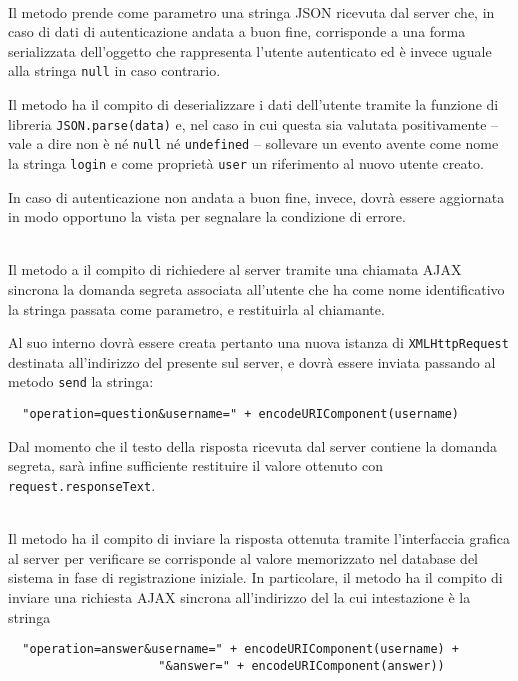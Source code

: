 \begin{description}

\item{}\\
Il metodo prende come parametro una stringa JSON ricevuta dal server che, in caso di dati di autenticazione andata a buon fine, corrisponde a una forma serializzata dell'oggetto che rappresenta l'utente autenticato ed è invece uguale alla stringa \verb+null+ in caso contrario.

Il metodo ha il compito di deserializzare i dati dell'utente tramite la funzione di libreria \verb+JSON.parse(data)+ e, nel caso in cui questa sia valutata positivamente -- vale a dire non è né \verb+null+ né \verb+undefined+ -- sollevare un evento avente come nome la stringa \verb'login' e come proprietà \verb+user+ un riferimento al nuovo utente creato.

In caso di autenticazione non andata a buon fine, invece, dovrà essere aggiornata in modo opportuno la vista per segnalare la condizione di errore.

\item{}\\
Il metodo a il compito di richiedere al server tramite una chiamata AJAX sincrona la domanda segreta associata all'utente che ha come nome identificativo la stringa passata come parametro, e restituirla al chiamante.

Al suo interno dovrà essere creata pertanto una nuova istanza di \verb+XMLHttpRequest+ destinata all'indirizzo del  presente sul server, e dovrà essere inviata  passando al metodo \verb+send+ la stringa:
\begin{verbatim}
  "operation=question&username=" + encodeURIComponent(username)
\end{verbatim}

Dal momento che il testo della risposta ricevuta dal server contiene la domanda segreta, sarà infine sufficiente restituire il valore ottenuto con \verb+request.responseText+.
	
\item{}\\
Il metodo ha il compito di inviare la risposta ottenuta tramite l'interfaccia grafica al server per verificare se corrisponde al valore memorizzato nel database del sistema in fase di registrazione iniziale. In particolare, il metodo ha il compito di inviare una richiesta AJAX sincrona all'indirizzo del  la cui intestazione è la stringa
\begin{verbatim}
  "operation=answer&username=" + encodeURIComponent(username) +
                     "&answer=" + encodeURIComponent(answer))
\end{verbatim}


\end{description}
